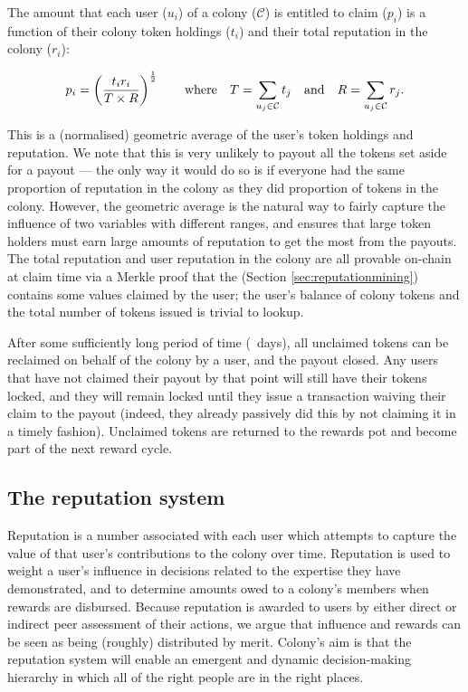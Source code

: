 The amount that each user ($u_i$) of a colony ($\mathcal{C}$) is entitled to claim ($p_i$) is a function of their colony token holdings ($t_i$) and their total reputation in the colony ($r_i$):

\begin{equation}\label{eq:reward-claim}
 p_i = \left(\frac{t_i r_i}{T \times R}\right)^{\frac{1}{2}} \qquad \textnormal{where} \quad T = \sum\limits_{u_j\in \mathcal{C}} t_j \quad\textnormal{and}\quad R = \sum\limits_{u_j\in \mathcal{C}} r_j.
\end{equation}

This is a (normalised) geometric average of the user's token holdings and reputation. We note that this is very unlikely to payout all the tokens set aside for a payout --- the only way it would do so is if everyone had the same proportion of reputation in the colony as they did proportion of tokens in the colony. However, the geometric average is the natural way to fairly capture the influence of two variables with different ranges, and ensures that large token holders must earn large amounts of reputation to get the most from the payouts. The total reputation and user reputation in the colony are all provable on-chain at claim time via a Merkle proof that the  (Section \ref{sec:reputationmining}) contains some values claimed by the user; the user's balance of colony tokens and the total number of tokens issued is trivial to lookup.

After some sufficiently long period of time (\rewardclaimduration\ days), all unclaimed tokens can be reclaimed on behalf of the colony by a user, and the payout closed. Any users that have not claimed their payout by that point will still have their tokens locked, and they will remain locked until they issue a transaction waiving their claim to the payout (indeed, they already passively did this by not claiming it in a timely fashion). Unclaimed tokens are returned to the rewards pot and become part of the next reward cycle.

\subsection{The reputation system}\label{sec:reputation}

Reputation is a number associated with each user which attempts to capture the value of that user's contributions to the colony over time. Reputation is used to weight a user's influence in decisions related to the expertise they have demonstrated, and to determine amounts owed to a colony's members when rewards are disbursed. Because reputation is awarded to users by either direct or indirect peer assessment of their actions, we argue that influence and rewards can be seen as being (roughly) distributed by merit. Colony's aim is that the reputation system will enable an emergent and dynamic decision-making hierarchy in which all of the right people are in the right places.

